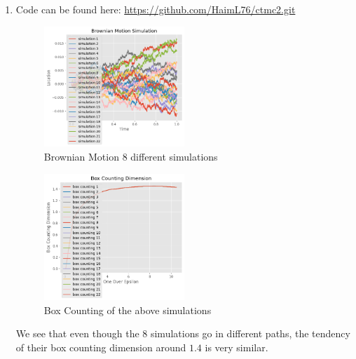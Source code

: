 \documentclass{article}
\begin{document}
\begin{enumerate}
\item Code can be found here: \url{https://github.com/HaimL76/ctmc2.git}

\begin{figure}[h]
\caption{Brownian Motion 8 different simulations}
\centering
\includegraphics[width=0.5\textwidth]{brownian_motion_simulation.png}
\end{figure}
\begin{figure}[h]
\caption{Box Counting of the above simulations}
\centering
\includegraphics[width=0.5\textwidth]{box_counting_dimensions.png}
\end{figure}
We see that even though the 8 simulations go in different paths, the tendency of their box counting dimension around $1.4$ is very similar.
\end{enumerate}
\end{document}
